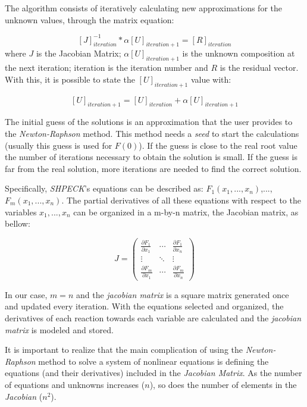 The algorithm consists of iteratively calculating new approximations for the unknown values, through the matrix equation:

\begin{equation}
\label{eq:iterativelyAlgorithm}
[J]^{-1}_{iteration}* \alpha [U]_{iteration+1} = [R]_{iteration}
\end{equation}
where $J$ is the Jacobian Matrix; $ \alpha [U]_{iteration+1} $ is the unknown composition at the next iteration; iteration is the iteration number and $R$ is the residual vector. With this, it is possible to state the $[U]_{iteration+1}$ value with:

\begin{equation}
\label{eq:CompositionCalculation}
[U]_{iteration+1} = [U]_{iteration} + \alpha [U]_{iteration+1}
\end{equation}

The initial guess of the solutions is an approximation that the user provides to the \emph{Newton-Raphson} method. This method needs a \emph{seed} to start the calculations (usually this guess is used for $F(0)$). 
If the guess is close to the real root value the number of iterations necessary to obtain the solution is small. If the guess is far from the real solution, more iterations are needed to find the correct solution.

Specifically, \emph{SHPECK}'s equations can be described as: $F_1(x_1,..., x_n)$,...,$F_m(x_1,...,x_n)$. The partial derivatives of all these equations with respect to the variables $x_1,...,x_n$ can be organized in a m-by-n matrix, the Jacobian matrix, as bellow:

\begin{equation} 
J =
 \begin{pmatrix}
  \frac{\partial F_1}{\partial x_1} & \cdots & \frac{\partial F_1}{\partial x_n} \\
  \vdots  & \ddots & \vdots  \\
  \frac{\partial F_m}{\partial x_1} & \cdots &   \frac{\partial F_m}{\partial x_n}
 \end{pmatrix}
\end{equation}

In our case, $m = n$ and the \emph{jacobian matrix} is a square matrix generated once and updated every iteration. With the equations selected and organized, the derivatives of each reaction towards each variable are calculated and the \emph{jacobian matrix} is modeled and stored. 

It is important to realize that the main complication of using the \emph{Newton-Raphson} method to solve a system of nonlinear equations is defining the equations (and their derivatives) included in the \emph{Jacobian Matrix}. 
As the number of equations and unknowns increases ($n$), so does the number of elements in the \emph{Jacobian} ($n^2$).
